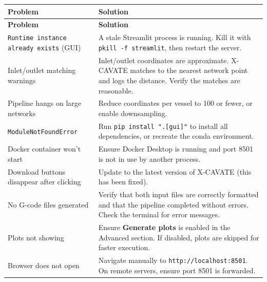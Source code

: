 \documentclass[11pt,letterpaper]{article}
\newcommand{\code}[1]{\texttt{#1}}
\newcommand{\gui}[1]{\textcolor{guicolor}{\textsf{\textbf{#1}}}}
\begin{document}
\begin{xltabular}{\textwidth}{L{4.5cm} X}
\toprule
\textbf{Problem} & \textbf{Solution} \\
\midrule
\endfirsthead
\toprule
\textbf{Problem} & \textbf{Solution} \\
\midrule
\endhead
\code{Runtime instance already exists} (GUI) &
A stale Streamlit process is running. Kill it with \code{pkill -f streamlit}, then restart the server. \\
\midrule
Inlet/outlet matching warnings &
Inlet/outlet coordinates are approximate. X-CAVATE matches to the nearest network point and logs the distance. Verify the matches are reasonable. \\
\midrule
Pipeline hangs on large networks &
Reduce coordinates per vessel to 100 or fewer, or enable downsampling. \\
\midrule
\code{ModuleNotFoundError} &
Run \code{pip install ".[gui]"} to install all dependencies, or recreate the conda environment. \\
\midrule
Docker container won't start &
Ensure Docker Desktop is running and port 8501 is not in use by another process. \\
\midrule
Download buttons disappear after clicking &
Update to the latest version of X-CAVATE (this has been fixed). \\
\midrule
No G-code files generated &
Verify that both input files are correctly formatted and that the pipeline completed without errors. Check the terminal for error messages. \\
\midrule
Plots not showing &
Ensure \gui{Generate plots} is enabled in the Advanced section. If disabled, plots are skipped for faster execution. \\
\midrule
Browser does not open &
Navigate manually to \code{http://localhost:8501}. On remote servers, ensure port 8501 is forwarded. \\
\bottomrule
\end{xltabular}
\end{document}
